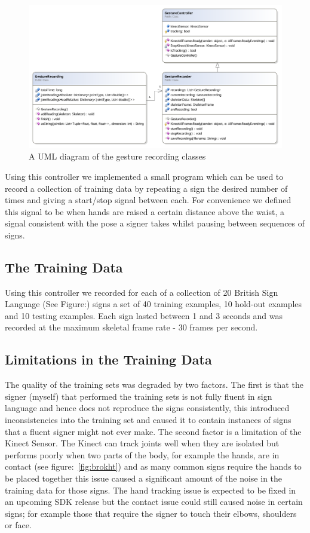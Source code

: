 \begin{figure}[t]
        \centering
        \includegraphics[width = 1.05\textwidth]{ThesisFigs/gestRecDiag}
        \caption{A UML diagram of the gesture recording classes}\label{fig:umlgest}
\end{figure}

Using this controller we implemented a small program which can be used to record a collection of training data by repeating a sign the desired number of times and giving a start/stop signal between each. For convenience we defined this signal to be when hands are raised a certain distance above the waist, a signal consistent with the pose a signer takes whilst pausing between sequences of signs.
 
\subsection{The Training Data}
Using this controller we recorded for each of a collection of 20 British Sign Language (See Figure:) signs a set of 40 training examples, 10 hold-out examples and 10 testing examples. Each sign lasted between 1 and 3 seconds and was recorded at the maximum skeletal frame rate - 30 frames per second.

\subsection{Limitations in the Training Data}
The quality of the training sets was degraded by two factors. The first is that the signer (myself) that performed the training sets is not fully fluent in sign language and hence does not reproduce the signs consistently, this introduced inconsistencies into the training set and caused it to contain instances of signs that a fluent signer might not ever make. The second factor is a  limitation of the Kinect Sensor. The Kinect can track joints well when they are isolated but performs poorly when two parts of the body, for example the hands, are in contact (see figure:~\ref{fig:brokht}) and as many common signs require the hands to be placed together this issue caused a significant amount of the noise in the training data for those signs. The hand tracking issue is expected to be fixed in an upcoming SDK release but the contact issue could still caused noise in certain signs; for example those that require the signer to touch their elbows, shoulders or face.

